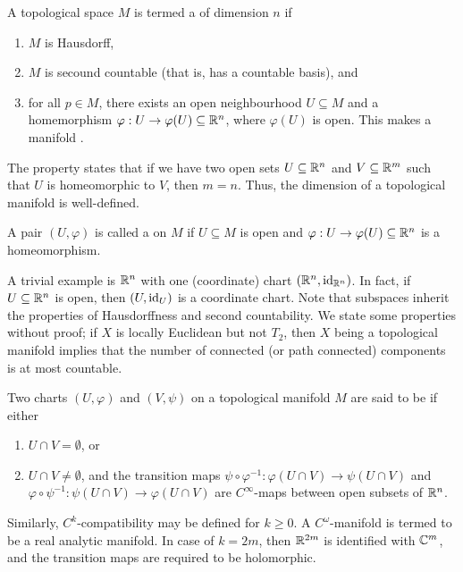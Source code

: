 \begin{definition}
    A topological space $M$ is termed a  of dimension $n$ if
    \begin{enumerate}
        \item $M$ is Hausdorff,
        \item $M$ is secound countable (that is, has a countable basis), and
        \item for all $p \in M$, there exists an open neighbourhood $U \subseteq M$ and a homemorphism $\varphi:U \to \varphi(U) \subseteq \mathbb{R}^{n}$, where $\varphi(U)$ is open. This makes a manifold .
    \end{enumerate}
\end{definition}

The  property states that if we have two open sets $U \subseteq \mathbb{R}^{n}$ and $V \subseteq \mathbb{R}^{m}$ such that $U$ is homeomorphic to $V$, then $m = n$. Thus, the dimension of a topological manifold is well-defined.

\begin{definition}
    A pair $(U,\varphi)$ is called a  on $M$ if $U \subseteq M$ is open and $\varphi:U \to \varphi(U) \subseteq \mathbb{R}^{n}$ is a homeomorphism. 
\end{definition}
A trivial example is $\mathbb{R}^{n}$ with one (coordinate) chart $(\mathbb{R}^{n},\operatorname{id}_{\mathbb{R}^{n}})$. In fact, if $U \subseteq \mathbb{R}^{n}$ is open, then $(U,\operatorname{id}_U)$ is a coordinate chart. Note that subspaces inherit the properties of Hausdorffness and second countability. We state some properties without proof; if $X$ is locally Euclidean but not $T_{2}$, then $X$ being a topological manifold implies that the number of connected (or path connected) components is at most countable.

\begin{definition}
    Two charts $(U,\varphi)$ and $(V,\psi)$ on a topological manifold $M$ are said to be  if either
    \begin{enumerate}
        \item $U \cap V = \emptyset$, or
        \item $U \cap V \neq \emptyset$, and the transition maps $\psi \circ \varphi^{-1}:\varphi(U \cap V) \to \psi(U \cap V)$ and $\varphi \circ \psi^{-1}:\psi(U \cap V) \to \varphi(U \cap V)$ are $C^{\infty}$-maps between open subsets of $\mathbb{R}^{n}$.
    \end{enumerate}
    Similarly, $C^{k}$-compatibility may be defined for $k \geq 0$. A $C^{\omega}$-manifold is termed to be a real analytic manifold. In case of $k = 2m$, then $\mathbb{R}^{2m}$ is identified with $\mathbb{C}^{m}$, and the transition maps are required to be holomorphic. 
\end{definition}

